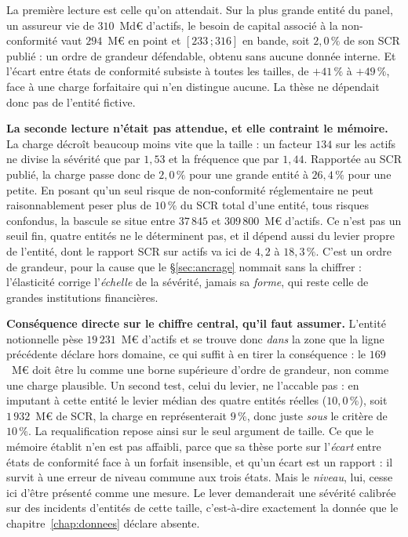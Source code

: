 \vspace{4pt}
La première lecture est celle qu'on attendait. Sur la plus grande entité du panel, un assureur
vie de $310$~Md\euro{} d'actifs, le besoin de capital associé à la non-conformité vaut
$294$~M\euro{} en point et $[233\,;316]$ en bande, soit $2{,}0\,\%$ de son SCR publié :
un ordre de grandeur défendable, obtenu sans aucune donnée interne. Et l'écart entre états de
conformité subsiste à toutes les tailles, de $+41\,\%$ à $+49\,\%$, face à une charge forfaitaire
qui n'en distingue aucune. La thèse ne dépendait donc pas de l'entité fictive.

\begin{attention}
\textbf{La seconde lecture n'était pas attendue, et elle contraint le mémoire.} La charge décroît
beaucoup moins vite que la taille : un facteur $134$ sur les actifs ne divise la sévérité que par
$1{,}53$ et la fréquence que par $1{,}44$. Rapportée au SCR publié, la charge passe donc
de $2{,}0\,\%$ pour une grande entité à $26{,}4\,\%$ pour une petite. En posant qu'un seul risque
de non-conformité réglementaire ne peut raisonnablement peser plus de $10\,\%$ du SCR
total d'une entité, tous risques confondus, la bascule se situe entre $37\,845$ et
$309\,800$~M\euro{} d'actifs. Ce n'est pas un seuil fin, quatre entités ne le déterminent pas,
et il dépend aussi du levier propre de l'entité, dont le rapport SCR sur actifs va ici
de $4{,}2$ à $18{,}3\,\%$. C'est un ordre de grandeur, pour la cause que le
\S\ref{sec:ancrage} nommait sans la chiffrer : l'élasticité corrige l'\emph{échelle} de la
sévérité, jamais sa \emph{forme}, qui reste celle de grandes institutions financières.
\end{attention}

\begin{cle}
\textbf{Conséquence directe sur le chiffre central, qu'il faut assumer.} L'entité notionnelle
pèse $19\,231$~M\euro{} d'actifs et se trouve donc \emph{dans} la zone que la ligne précédente
déclare hors domaine, ce qui suffit à en tirer la conséquence : le $169$~M\euro{} doit être lu
comme une borne supérieure d'ordre de grandeur, non comme une charge plausible. Un
second test, celui du levier, ne l'accable pas : en imputant à cette entité le levier médian des
quatre entités réelles ($10{,}0\,\%$), soit $1\,932$~M\euro{} de SCR, la charge en
représenterait $9\,\%$, donc juste \emph{sous} le critère de $10\,\%$. La requalification repose
ainsi sur le seul argument de taille. Ce que le mémoire établit n'en est pas
affaibli, parce que sa thèse porte sur l'\emph{écart} entre états de conformité face à un
forfait insensible, et qu'un écart est un rapport : il survit à une erreur de niveau commune aux
trois états. Mais le \emph{niveau}, lui, cesse ici d'être présenté comme une mesure. Le lever
demanderait une sévérité calibrée sur des incidents d'entités de cette taille, c'est-à-dire
exactement la donnée que le chapitre~\ref{chap:donnees} déclare absente.
\end{cle}

